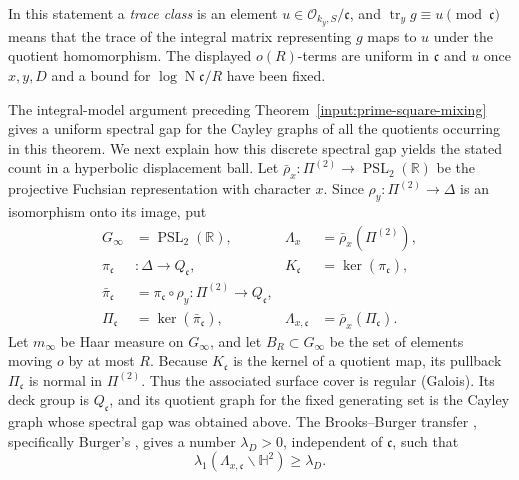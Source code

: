 \documentclass[11pt,reqno]{amsart}
\theoremstyle{definition}
\theoremstyle{remark}
\newcommand{\R}{\mathbb R}
\newcommand{\cO}{\mathcal O}
\newcommand{\Tr}{\operatorname{tr}}
\newcommand{\PSL}{\operatorname{PSL}}
\newcommand{\Norm}{\operatorname{N}}
\begin{document}
In this statement a \emph{trace class} is an element
\(u\in\cO_{k_y,S}/\mathfrak c\), and
\(\Tr_y g\equiv u\pmod{\mathfrak c}\) means that the trace of the integral
matrix representing \(g\) maps to \(u\) under the quotient homomorphism.
The displayed \(o(R)\)-terms are uniform in \(\mathfrak c\) and \(u\) once
\(x,y,D\) and a bound for \(\log\Norm\mathfrak c/R\) have been fixed.

The integral-model argument preceding
Theorem~\ref{input:prime-square-mixing} gives a uniform spectral gap for
the Cayley graphs of all the quotients occurring in this theorem.  We next
explain how this discrete spectral gap yields the stated count in a
hyperbolic displacement ball.  Let
\(\bar\rho_x:\Pi^{(2)}\to\PSL_2(\R)\) be the projective Fuchsian
representation with character \(x\).  Since
\(\rho_y:\Pi^{(2)}\to\Delta\) is an isomorphism onto its image, put
\[
\begin{aligned}
 G_\infty&=\PSL_2(\R),
 &\Lambda_x&=\bar\rho_x(\Pi^{(2)}),\\
 \pi_{\mathfrak c}&:\Delta\longrightarrow Q_{\mathfrak c},
 &K_{\mathfrak c}&=\ker(\pi_{\mathfrak c}),\\
 \bar\pi_{\mathfrak c}
 &=\pi_{\mathfrak c}\circ\rho_y:
      \Pi^{(2)}\longrightarrow Q_{\mathfrak c},\\
 \Pi_{\mathfrak c}&=\ker(\bar\pi_{\mathfrak c}),
 &\Lambda_{x,\mathfrak c}&=\bar\rho_x(\Pi_{\mathfrak c}).
\end{aligned}
\]
Let \(m_\infty\) be Haar measure on \(G_\infty\), and let
\(B_R\subset G_\infty\) be the set of elements moving \(o\) by at most
\(R\).
Because \(K_{\mathfrak c}\) is the kernel of a quotient map, its pullback
\(\Pi_{\mathfrak c}\) is normal in \(\Pi^{(2)}\).  Thus the
associated surface cover is regular (Galois).  Its deck group is
\(Q_{\mathfrak c}\), and its quotient graph for the fixed generating set
is the Cayley graph whose spectral gap was obtained above.
The Brooks--Burger transfer \cite{BrooksTower,Burger}, specifically
Burger's \cite[Th\'eor\`eme~B]{Burger}, gives a number \(\lambda_D>0\),
independent of \(\mathfrak c\), such that
\[
 \lambda_1(\Lambda_{x,\mathfrak c}\backslash\mathbb H^2)\ge\lambda_D.
\]
\end{document}

